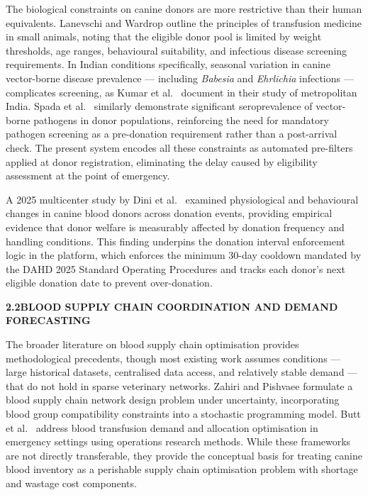 \documentclass[12pt,a4paper]{article}
\begin{document}
\noindent The biological constraints on canine donors are more restrictive than their human equivalents. Lanevschi and Wardrop \cite{lanevschi2001} outline the principles of transfusion medicine in small animals, noting that the eligible donor pool is limited by weight thresholds, age ranges, behavioural suitability, and infectious disease screening requirements. In Indian conditions specifically, seasonal variation in canine vector-borne disease prevalence — including \textit{Babesia} and \textit{Ehrlichia} infections — complicates screening, as Kumar et al.\ \cite{kumar2022} document in their study of metropolitan India. Spada et al.\ \cite{spada2016} similarly demonstrate significant seroprevalence of vector-borne pathogens in donor populations, reinforcing the need for mandatory pathogen screening as a pre-donation requirement rather than a post-arrival check. The present system encodes all these constraints as automated pre-filters applied at donor registration, eliminating the delay caused by eligibility assessment at the point of emergency.

\noindent A 2025 multicenter study by Dini et al.\ \cite{dini2025} examined physiological and behavioural changes in canine blood donors across donation events, providing empirical evidence that donor welfare is measurably affected by donation frequency and handling conditions. This finding underpins the donation interval enforcement logic in the platform, which enforces the minimum 30-day cooldown mandated by the DAHD 2025 Standard Operating Procedures \cite{dahd2025, pib2025} and tracks each donor's next eligible donation date to prevent over-donation.

\vspace{2em}
\noindent\textbf{2.2\quad BLOOD SUPPLY CHAIN COORDINATION AND DEMAND FORECASTING}
\vspace{0.8em}

\noindent The broader literature on blood supply chain optimisation provides methodological precedents, though most existing work assumes conditions — large historical datasets, centralised data access, and relatively stable demand — that do not hold in sparse veterinary networks. Zahiri and Pishvaee \cite{zahiri2018} formulate a blood supply chain network design problem under uncertainty, incorporating blood group compatibility constraints into a stochastic programming model. Butt et al.\ \cite{butt2018} address blood transfusion demand and allocation optimisation in emergency settings using operations research methods. While these frameworks are not directly transferable, they provide the conceptual basis for treating canine blood inventory as a perishable supply chain optimisation problem with shortage and wastage cost components.
\end{document}
